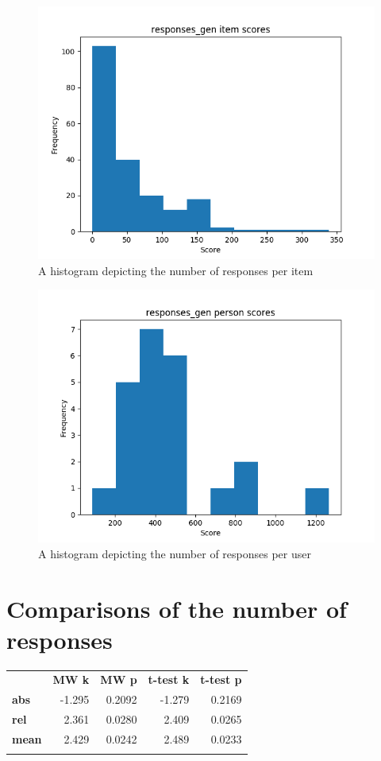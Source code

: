\begin{figure}
    \centering
    \includegraphics[width=.7\textwidth]{img/responses_gen_diff.png}
    \caption{A histogram depicting the number of responses per item}
    \label{fig:responses_gen_diff}
\end{figure}
\begin{figure}
    \centering
    \includegraphics[width=.7\textwidth]{img/responses_gen_abil.png}
    \caption{A histogram depicting the number of responses per user}
    \label{fig:responses_gen_abil}
\end{figure}

\section{Comparisons of the number of responses}

\begin{longtable}[c]{@{}lrrrr@{}}
\toprule\addlinespace
& \textbf{MW k} & \textbf{MW p} &
\textbf{t-test k} & \textbf{t-test p}
\\\addlinespace
\midrule
\textbf{abs} & -1.295 & 0.2092 & -1.279 & 0.2169
\\\addlinespace
\textbf{rel} & 2.361 & 0.0280 & 2.409 & 0.0265
\\\addlinespace
\textbf{mean} & 2.429 & 0.0242 & 2.489 & 0.0233
\\\addlinespace
\bottomrule
    \label{tab:responses_comp}
\end{longtable}

